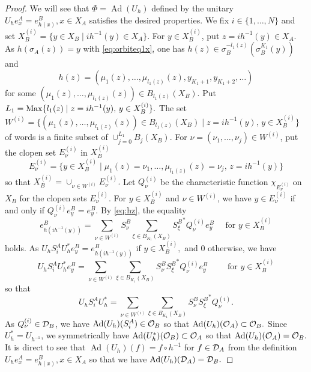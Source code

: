 \documentclass[11pt]{article}
\theoremstyle{plain}
\theoremstyle{definition}
\numberwithin{equation}{section}
\newcommand{\Ad}{\operatorname{Ad}}
\begin{document}
\begin{proof}
We will see that
$\Phi = \Ad (U_h)$
defined by 
the unitary
$
U_h e_x^A = e_{h(x)}^B,
x \in X_A
$
satisfies the desired properties.
We fix $i \in \{1,\dots,N\}$
and
set
$X_B^{(i)} = \{ y \in X_B \mid ih^{-1}(y) \in X_A \}$.
For $y \in X_B^{(i)}$,
put
$z = ih^{-1}(y) \in X_A$.
As $h(\sigma_A(z)) =y$
with \eqref{eq:orbiteq1x}, 
one has
$h(z) 
\in  \sigma_B^{-l_1(z)}(\sigma_B^{K_1}(y))$
and 
\begin{equation}
h(z) = (\mu_1(z),\dots,\mu_{l_1(z)}(z), y_{K_1+1}, y_{K_1+2}, \dots ) 
\label{eq:hz}
\end{equation}
for some
$(\mu_1(z),\dots,\mu_{l_1(z)}(z)) \in B_{l_1(z)}(X_B)$.
Put
$
L_1= {{\operatorname{Max}}}\{l_1(z) \mid z = i h^{-1}(y), \, y \in X_B^{(i)} \}.
$
The set 
$
W^{(i)} =\{(\mu_1(z),\dots,\mu_{l_1(z)}(z)) \in B_{l_1(z)}(X_B) 
\mid z = i h^{-1}(y), \, y \in X_B^{(i)} \}
$
of words 
is a finite subset of
$\cup_{j=0}^{L_1}B_j(X_B)$.
For $\nu=(\nu_1,\dots, \nu_j) \in W^{(i)}$,
put the clopen set
$
E_\nu^{(i)}
$
 in $X_B^{(i)}$
$$
E_\nu^{(i)} =\{ y \in X_B^{(i)} 
\mid \mu_1(z) = \nu_1,\dots,\mu_{l_1(z)}(z) =\nu_j, \, z = i h^{-1}(y)  \}
$$
so that 
$
X_B^{(i)} 
= \cup_{\nu \in W^{(i)} }E_\nu^{(i)}.
$
Let
$
Q_\nu^{(i)} 
$
be
the characteristic function
$
\chi_{E_\nu^{(i)}}
$
on $X_B$
for the clopen sets 
$
E_\nu^{(i)}.
$
For $y \in X_B^{(i)}$ 
and
$ \nu \in W^{(i)}$,  
we have
$ y \in E_\nu^{(i)}$ 
if and only if
$Q_\nu^{(i)}e_y^B = e_y^B$.
By \eqref{eq:hz},
the equality
\begin{equation*}
e_{h(ih^{-1}(y))}^B 
= \sum_{\nu \in W^{(i)}}
 S_{\nu}^B \sum_{\xi\in B_{K_1}(X_B)}{S_\xi^B}^* Q_\nu^{(i)} e_y^B
 \quad
 \text{ for } y \in X_B^{(i)}
\end{equation*}
holds. 
As
$
U_h S_i^A U_h^* e_y^B 
= 
e_{h(ih^{-1}(y))}^B 
$
if
$y \in X_B^{(i)},$
and
$0$
otherwise, we have
\begin{equation*}
U_h S_i^A U_h^* e_y^B  
= \sum_{\nu \in W^{(i)}}\sum_{\xi\in B_{K_1}(X_B)}
 S_{\nu}^B {S_\xi^B}^* Q_\nu^{(i)} e_y^B
\qquad \text{ for } y \in X_B^{(i)}
\end{equation*}
so that 
\begin{equation*}
U_h S_i^A U_h^*  
= \sum_{\nu \in W^{(i)}} \sum_{\xi\in B_{K_1}(X_B)}
 S_{\nu}^B {S_\xi^B}^* Q_\nu^{(i)}.
\end{equation*}
As $ Q_\nu^{(i)}\in {{\mathcal{D}}_B}$,
we have
$\Ad(U_h) (S_i^A) \in \OB$  
so that 
$\Ad(U_h) (\OA) \subset \OB.$  
Since $U_h^* = U_{h^{-1}}$, 
we symmetrically have
$\Ad(U_h^*) (\OB) \subset \OA$
so that 
$\Ad(U_h) (\OA) = \OB.$
It is direct to see that 
$\Ad(U_h) (f) = f \circ h^{-1}$ for $ f \in {{\mathcal{D}}_A}$
from the definition $U_h e_x^A = e_{h(x)}^B, x \in X_A$
so that we have
$\Ad(U_h) (\DA) = \DB.$


\end{proof}
\end{document}
